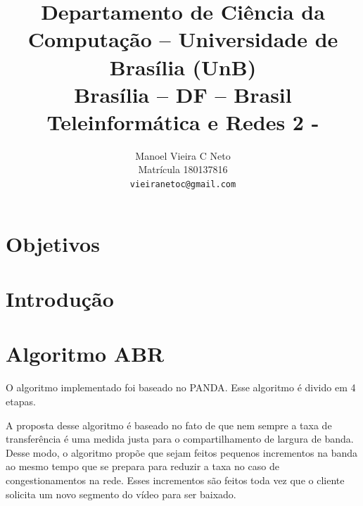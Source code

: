 \documentclass[10pt,twocolumn,letterpaper]{article}
\begin{document}
	
	\title{Departamento de Ciência da Computação -- Universidade de Brasília (UnB)\\
		Brasília -- DF -- Brasil\\
		Teleinformática e Redes 2 - \\
	}
	
	\author{
		Manoel Vieira C Neto\\ 
		Matrícula 180137816\\
		{\tt\small vieiranetoc@gmail.com}
		\and
	}
	\maketitle
	
	\begin{abstract}
		
		
	\end{abstract}
	
	\section{Objetivos}
	
	\section{Introdução}
	
	
	
	
	
	
	\section{Algoritmo ABR}
	O algoritmo implementado foi baseado no PANDA\cite{panda}. Esse algoritmo é divido em 4 etapas.
	
	A proposta desse algoritmo é baseado no fato de que nem sempre a taxa de transferência é uma medida justa para o compartilhamento de largura de banda. Desse modo, o algoritmo propõe que sejam feitos pequenos incrementos na banda ao mesmo tempo que se prepara para reduzir a taxa no caso de congestionamentos na rede. Esses incrementos são feitos toda vez que o cliente solicita um novo segmento do vídeo para ser baixado.
	
\end{document}
